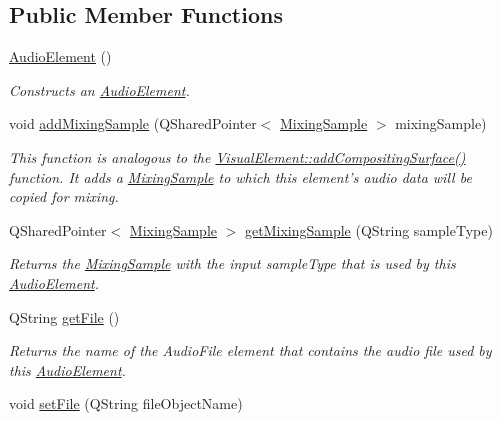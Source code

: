 \subsection*{Public Member Functions}
\begin{DoxyCompactItemize}
\item 
\hyperlink{class_picto_1_1_audio_element_a76289957ff02b44e744a77dfc47dd9fb}{Audio\-Element} ()
\begin{DoxyCompactList}\small\item\em Constructs an \hyperlink{class_picto_1_1_audio_element}{Audio\-Element}. \end{DoxyCompactList}\item 
void \hyperlink{class_picto_1_1_audio_element_a3c62174d423e0596b251c78ef658d686}{add\-Mixing\-Sample} (Q\-Shared\-Pointer$<$ \hyperlink{class_picto_1_1_mixing_sample}{Mixing\-Sample} $>$ mixing\-Sample)
\begin{DoxyCompactList}\small\item\em This function is analogous to the \hyperlink{struct_picto_1_1_visual_element_a3be26e20cb27604c8d978cf334898dd9}{Visual\-Element\-::add\-Compositing\-Surface()} function. It adds a \hyperlink{class_picto_1_1_mixing_sample}{Mixing\-Sample} to which this element's audio data will be copied for mixing. \end{DoxyCompactList}\item 
\hypertarget{class_picto_1_1_audio_element_a9bed46b491e06b6aa287bacc033f064d}{Q\-Shared\-Pointer$<$ \hyperlink{class_picto_1_1_mixing_sample}{Mixing\-Sample} $>$ \hyperlink{class_picto_1_1_audio_element_a9bed46b491e06b6aa287bacc033f064d}{get\-Mixing\-Sample} (Q\-String sample\-Type)}\label{class_picto_1_1_audio_element_a9bed46b491e06b6aa287bacc033f064d}

\begin{DoxyCompactList}\small\item\em Returns the \hyperlink{class_picto_1_1_mixing_sample}{Mixing\-Sample} with the input sample\-Type that is used by this \hyperlink{class_picto_1_1_audio_element}{Audio\-Element}. \end{DoxyCompactList}\item 
\hypertarget{class_picto_1_1_audio_element_a599431f9071ff2b34028ad7ae609df29}{Q\-String \hyperlink{class_picto_1_1_audio_element_a599431f9071ff2b34028ad7ae609df29}{get\-File} ()}\label{class_picto_1_1_audio_element_a599431f9071ff2b34028ad7ae609df29}

\begin{DoxyCompactList}\small\item\em Returns the name of the Audio\-File element that contains the audio file used by this \hyperlink{class_picto_1_1_audio_element}{Audio\-Element}. \end{DoxyCompactList}\item 
\hypertarget{class_picto_1_1_audio_element_a7015d2ff8956d54907d1ed6f79634aa2}{void \hyperlink{class_picto_1_1_audio_element_a7015d2ff8956d54907d1ed6f79634aa2}{set\-File} (Q\-String file\-Object\-Name)}\label{class_picto_1_1_audio_element_a7015d2ff8956d54907d1ed6f79634aa2}


\end{DoxyCompactItemize}

